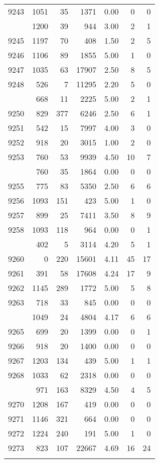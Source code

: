 \documentclass[
]{article}
\begin{document}
\begin{table}
\begin{tabular}[t]{lrrrrrr}
9243 & 1051 & 35 & 1371 & 0.00 & 0 & 0\\
\addlinespace
9244 & 1200 & 39 & 944 & 3.00 & 2 & 1\\
9245 & 1197 & 70 & 408 & 1.50 & 2 & 5\\
9246 & 1106 & 89 & 1855 & 5.00 & 1 & 0\\
9247 & 1035 & 63 & 17907 & 2.50 & 8 & 5\\
9248 & 526 & 7 & 11295 & 2.20 & 5 & 0\\
\addlinespace
9249 & 668 & 11 & 2225 & 5.00 & 2 & 1\\
9250 & 829 & 377 & 6246 & 2.50 & 6 & 1\\
9251 & 542 & 15 & 7997 & 4.00 & 3 & 0\\
9252 & 918 & 20 & 3015 & 1.00 & 2 & 0\\
9253 & 760 & 53 & 9939 & 4.50 & 10 & 7\\
\addlinespace
9254 & 760 & 35 & 1864 & 0.00 & 0 & 0\\
9255 & 775 & 83 & 5350 & 2.50 & 6 & 6\\
9256 & 1093 & 151 & 423 & 5.00 & 1 & 0\\
9257 & 899 & 25 & 7411 & 3.50 & 8 & 9\\
9258 & 1093 & 118 & 964 & 0.00 & 0 & 1\\
\addlinespace
9259 & 402 & 5 & 3114 & 4.20 & 5 & 1\\
9260 & 0 & 220 & 15601 & 4.11 & 45 & 17\\
9261 & 391 & 58 & 17608 & 4.24 & 17 & 9\\
9262 & 1145 & 289 & 1772 & 5.00 & 5 & 8\\
9263 & 718 & 33 & 845 & 0.00 & 0 & 0\\
\addlinespace
9264 & 1049 & 24 & 4804 & 4.17 & 6 & 6\\
9265 & 699 & 20 & 1399 & 0.00 & 0 & 1\\
9266 & 918 & 20 & 1400 & 0.00 & 0 & 0\\
9267 & 1203 & 134 & 439 & 5.00 & 1 & 1\\
9268 & 1033 & 62 & 2318 & 0.00 & 0 & 0\\
\addlinespace
9269 & 971 & 163 & 8329 & 4.50 & 4 & 5\\
9270 & 1208 & 167 & 419 & 0.00 & 0 & 0\\
9271 & 1146 & 321 & 664 & 0.00 & 0 & 0\\
9272 & 1224 & 240 & 191 & 5.00 & 1 & 0\\
9273 & 823 & 107 & 22667 & 4.69 & 16 & 24\\
\addlinespace

\end{tabular}
\end{table}
\end{document}
